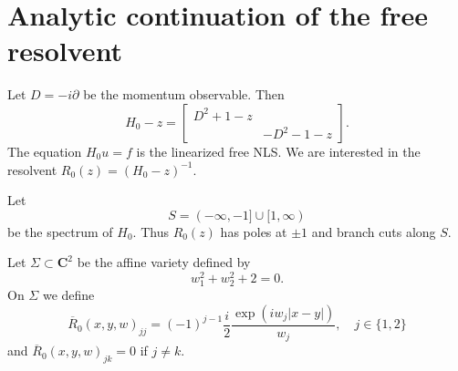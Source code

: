\documentclass[reqno,12pt,letterpaper]{amsart}
\newcommand{\CC}{\mathbf{C}}
\theoremstyle{definition}
\begin{document}
\section{Analytic continuation of the free resolvent}
Let $D = -i\partial$ be the momentum observable.
Then
$$H_0 - z = \begin{bmatrix}
D^2 + 1 - z\\
&-D^2 - 1 -z
\end{bmatrix}.$$
The equation $H_0u = f$ is the linearized free NLS.
We are interested in the resolvent $R_0(z) = (H_0 - z)^{-1}$.

Let
$$S = (-\infty, -1] \cup [1, \infty)$$
be the spectrum of $H_0$. Thus $R_0(z)$ has poles at $\pm 1$ and branch cuts along $S$.

Let $\Sigma \subset \CC^2$ be the affine variety defined by
\begin{equation}
\label{definition of affine variety}
w_1^2 + w_2^2 + 2 = 0.
\end{equation}
On $\Sigma$ we define
\begin{equation}
\label{free analytic continuation}
\overline R_0(x, y, w)_{jj} = (-1)^{j-1} \frac{i}{2} \frac{\exp(iw_j|x-y|)}{w_j},\quad j \in \{1, 2\}
\end{equation}
and $\overline R_0(x, y, w)_{jk} = 0$ if $j \neq k$.
\end{document}
